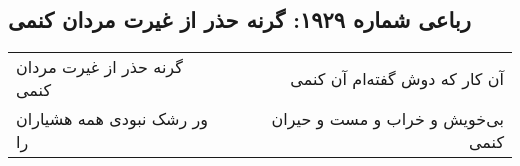 \begin{center}
\section*{رباعی شماره ۱۹۲۹: گرنه حذر از غیرت مردان کنمی}
\label{sec:1929}
\begin{longtable}{l p{0.5cm} r}
گرنه حذر از غیرت مردان کنمی
&&
آن کار که دوش گفته‌ام آن کنمی
\\
ور رشک نبودی همه هشیاران را
&&
بی‌خویش و خراب و مست و حیران کنمی
\\
\end{longtable}
\end{center}
